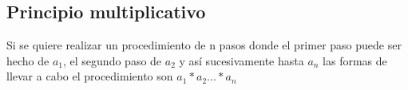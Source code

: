 \subsection{Principio multiplicativo}
Si se quiere realizar un procedimiento de n pasos donde el primer paso puede ser hecho de $a_{1}$, el segundo paso
de $a_{2}$ y así sucesivamente hasta $a_{n}$ las formas de llevar a cabo el procedimiento son $a_{1}*a_{2} ... *a_{n}$
